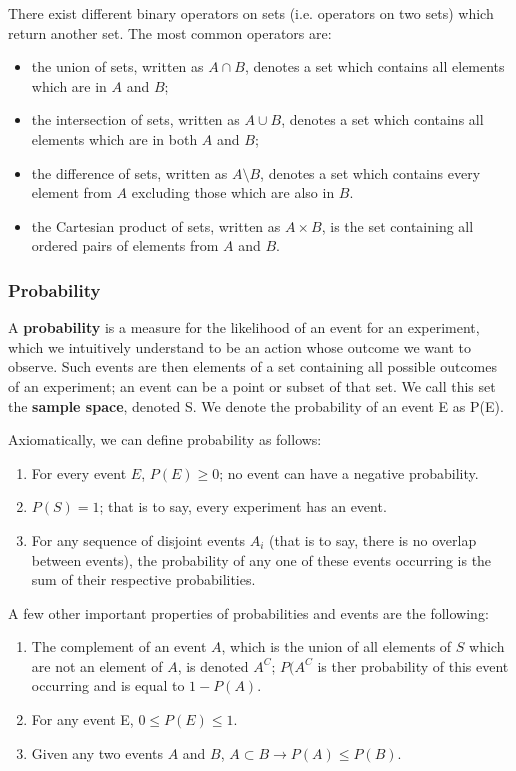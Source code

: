 There exist different binary operators on sets (i.e. operators on two
sets) which return another set. The most common operators are:
\begin{itemize}
\item the union of sets, written as $A \cap B$, denotes a set which
contains all elements which are in $A$ and $B$;
\item the intersection of sets, written as $A \cup B$, denotes a set
which contains all elements which are in both $A$ and $B$;
\item the difference of sets, written as $A \setminus B$, denotes a
set which contains every element from $A$ excluding those which are
also in $B$.
\item the Cartesian product of sets, written as $A \times B$, is the
set containing all ordered pairs of elements from $A$ and $B$.
\end{itemize}

\subsubsection{Probability}
\label{sec:probability}

A \textbf{probability} is a measure for the likelihood of an event for an
experiment, which we intuitively understand to be an action whose
outcome we want to observe. Such events are then elements of a set
containing all possible outcomes of an experiment; an event can be a
point or subset of that set. We call this set the \textbf{sample space},
denoted S. We denote the probability of an event E as P(E).

Axiomatically, we can define probability as follows:

\begin{enumerate}
  \item For every event $E$, $P(E) \geq 0$; no event can have a negative probability.
  \item $P(S) = 1$; that is to say, every experiment has an event.
  \item For any sequence of disjoint events $A_i$ (that is to say,
    there is no overlap between events), the probability of any one of
    these events occurring is the sum of their respective probabilities.
\end{enumerate}

A few other important properties of probabilities and events are the following:

\begin{enumerate}
  \item The complement of an event $A$, which is the union of all
    elements of $S$ which are not an element of $A$, is denoted $A^C$;
    $P(A^C$ is ther probability of this event occurring and is equal to $1
    - P(A)$.
  \item For any event E, $0 \leq P(E) \leq 1$.
  \item Given any two events $A$ and $B$, $A \subset B \rightarrow P(A) \leq P(B)$.
\end{enumerate}

